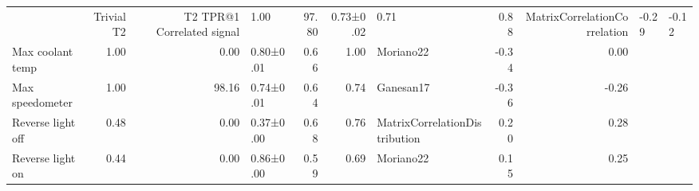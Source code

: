 \begin{tabular}{lrrlrrlrr}
\toprule
 & Trivial T2 & T2 TPR@1%
\midrule
Correlated signal & 1.00 & 97.80 & 0.73±0.02 & 0.71 & 0.88 & MatrixCorrelationCorrelation & -0.29 & -0.12 \\
Max coolant temp & 1.00 & 0.00 & 0.80±0.01 & 0.66 & 1.00 & Moriano22 & -0.34 & 0.00 \\
Max speedometer & 1.00 & 98.16 & 0.74±0.01 & 0.64 & 0.74 & Ganesan17 & -0.36 & -0.26 \\
Reverse light off & 0.48 & 0.00 & 0.37±0.00 & 0.68 & 0.76 & MatrixCorrelationDistribution & 0.20 & 0.28 \\
Reverse light on & 0.44 & 0.00 & 0.86±0.00 & 0.59 & 0.69 & Moriano22 & 0.15 & 0.25 \\
\bottomrule
\end{tabular}
